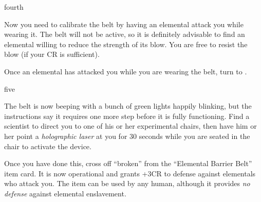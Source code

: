 \documentclass[notebook]{elementals}
\begin{document}
\begin{page}{fourth}

Now you need to calibrate the belt by having an elemental attack you while wearing it. The belt will not be active, so it is definitely advisable to find an elemental willing to reduce the strength of its blow. You are free to resist the blow (if your CR is sufficient).

Once an elemental has attacked you while you are wearing the belt, turn to .

\end{page}

\begin{page}{five}

The belt is now beeping with a bunch of green lights happily blinking, but the instructions say it requires one more step before it is fully functioning. Find a scientist to direct you to one of his or her experimental chairs, then have him or her point a \emph{holographic laser} \iHolographicLaser{\MYnumber} at you for 30 seconds while you are seated in the chair to activate the device.

Once you have done this, cross off ``broken'' from the ``Elemental Barrier Belt'' item card. It is now operational and grants +3CR to defense against elementals who attack you. The item can be used by any human, although it provides \emph{no defense} against elemental enslavement.

\end{page}

\endnotebook
\end{document}
